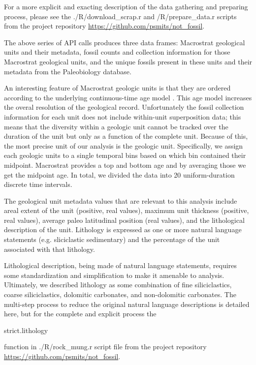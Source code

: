 \documentclass[12pt,letterpaper]{article}
\begin{document}
For a more explicit and exacting description of the data gathering and preparing process, please see the ./R/download\_scrap.r and /R/prepare\_data.r scripts from the project repository \url{https://github.com/psmits/not\_fossil}.

The above series of API calls produces three data frames: Macrostrat geological units and their metadata, fossil counts and collection information for those Macrostrat geological units, and the unique fossils present in these units and their metadata from the Paleobiology database. 

An interesting feature of Macrostrat geologic units is that they are ordered according to the underlying continuous-time age model \citep{Peters2018}. This age model increases the overal resolution of the geological record. Unfortunately the fossil collection information for each unit does not include within-unit superposition data; this means that the diversity within a geologic unit cannot be tracked over the duration of the unit but only as a function of the complete unit. Because of this, the most precise unit of our analysis is the geologic unit. Specifically, we assign each geologic units to a single temporal bins based on which bin contained their midpoint. Macrostrat provides a top and bottom age and by averaging those we get the midpoint age. In total, we divided the data into 20 uniform-duration discrete time intervals.

The geological unit metadata values that are relevant to this analysis include areal extent of the unit (positive, real values), maximum unit thickness (positive, real values), average paleo latitudinal position (real values), and the lithological description of the unit. Lithology is expressed as one or more natural language statements (e.g. sliciclastic sedimentary) and the percentage of the unit associated with that lithology.

Lithological description, being made of natural language statements, requires some standardization and simplification to make it amenable to analysis. Ultimately, we described lithology as some combination of fine siliciclastics, coarse siliciclastics, dolomitic carbonates, and non-dolomitic carbonates. The multi-step process to reduce the original natural language descriptions is detailed here, but for the complete and explicit process the \begin{tt} strict.lithology \end{tt} function in ./R/rock\_mung.r script file from the project repository \url{https://github.com/psmits/not\_fossil}. 
\end{document}

